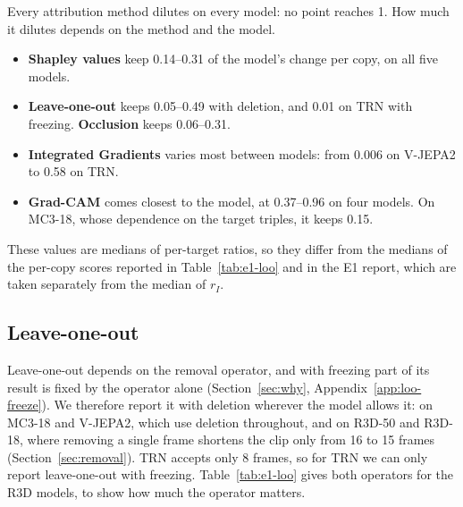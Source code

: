 Every attribution method dilutes on every model: no point reaches 1.
How much it dilutes depends on the method and the model.
\begin{itemize}
  \item \textbf{Shapley values} keep 0.14--0.31 of the model's change per copy, on all five models.
  \item \textbf{Leave-one-out} keeps 0.05--0.49 with deletion, and 0.01 on TRN with freezing. \textbf{Occlusion} keeps 0.06--0.31.
  \item \textbf{Integrated Gradients} varies most between models: from 0.006 on V-JEPA2 to 0.58 on TRN.
  \item \textbf{Grad-CAM} comes closest to the model, at 0.37--0.96 on four models. On MC3-18, whose dependence on the target triples, it keeps 0.15.
\end{itemize}
These values are medians of per-target ratios, so they differ from the medians of the per-copy scores reported in Table~\ref{tab:e1-loo} and in the E1 report, which are taken separately from the median of $r_I$.


\subsection{Leave-one-out}
\label{sec:e1-loo}

Leave-one-out depends on the removal operator, and with freezing part of its result is fixed by the operator alone (Section~\ref{sec:why}, Appendix~\ref{app:loo-freeze}).
We therefore report it with deletion wherever the model allows it: on MC3-18 and V-JEPA2, which use deletion throughout, and on R3D-50 and R3D-18, where removing a single frame shortens the clip only from 16 to 15 frames (Section~\ref{sec:removal}).
TRN accepts only 8 frames, so for TRN we can only report leave-one-out with freezing.
Table~\ref{tab:e1-loo} gives both operators for the R3D models, to show how much the operator matters.

